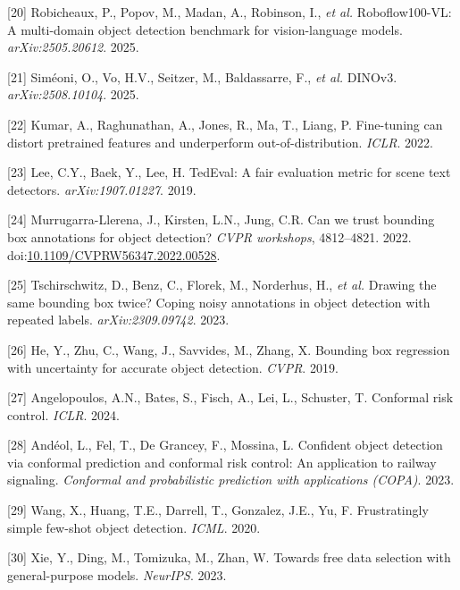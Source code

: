 \documentclass[
  10pt,
]{article}
\newlength{\cslhangindent}
\newenvironment{CSLReferences}[2] %
 {\begin{list}{}{%
  \setlength{\itemindent}{0pt}
  \setlength{\leftmargin}{0pt}
  \setlength{\parsep}{0pt}
  \ifodd #1
   \setlength{\leftmargin}{\cslhangindent}
   \setlength{\itemindent}{-1\cslhangindent}
  \fi
  \setlength{\itemsep}{#2\baselineskip}}}
 {\end{list}}
\begin{document}
\begin{CSLReferences}{0}{0}
{[}20{]} Robicheaux, P., Popov, M., Madan, A., Robinson, I., \emph{et
al.} {Roboflow100-VL}: A multi-domain object detection benchmark for
vision-language models. \emph{arXiv:2505.20612}. 2025.

{[}21{]} Siméoni, O., Vo, H.V., Seitzer, M., Baldassarre, F., \emph{et
al.} {DINOv3}. \emph{arXiv:2508.10104}. 2025.

{[}22{]} Kumar, A., Raghunathan, A., Jones, R., Ma, T., Liang, P.
Fine-tuning can distort pretrained features and underperform
out-of-distribution. \emph{ICLR}. 2022.

{[}23{]} Lee, C.Y., Baek, Y., Lee, H. {TedEval}: A fair evaluation
metric for scene text detectors. \emph{arXiv:1907.01227}. 2019.

{[}24{]} Murrugarra-Llerena, J., Kirsten, L.N., Jung, C.R. Can we trust
bounding box annotations for object detection? \emph{CVPR workshops},
4812--4821. 2022.
doi:\href{https://doi.org/10.1109/CVPRW56347.2022.00528}{10.1109/CVPRW56347.2022.00528}.

{[}25{]} Tschirschwitz, D., Benz, C., Florek, M., Norderhus, H.,
\emph{et al.} Drawing the same bounding box twice? Coping noisy
annotations in object detection with repeated labels.
\emph{arXiv:2309.09742}. 2023.

{[}26{]} He, Y., Zhu, C., Wang, J., Savvides, M., Zhang, X. Bounding box
regression with uncertainty for accurate object detection. \emph{CVPR}.
2019.

{[}27{]} Angelopoulos, A.N., Bates, S., Fisch, A., Lei, L., Schuster, T.
Conformal risk control. \emph{ICLR}. 2024.

{[}28{]} Andéol, L., Fel, T., De Grancey, F., Mossina, L. Confident
object detection via conformal prediction and conformal risk control: An
application to railway signaling. \emph{Conformal and probabilistic
prediction with applications (COPA)}. 2023.

{[}29{]} Wang, X., Huang, T.E., Darrell, T., Gonzalez, J.E., Yu, F.
Frustratingly simple few-shot object detection. \emph{ICML}. 2020.

{[}30{]} Xie, Y., Ding, M., Tomizuka, M., Zhan, W. Towards free data
selection with general-purpose models. \emph{NeurIPS}. 2023.


\end{CSLReferences}
\end{document}
